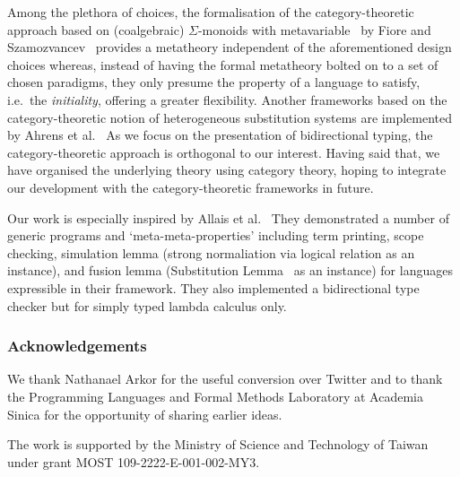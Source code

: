\documentclass[envcountsect,runningheads,a4paper]{llncs}
\begin{document}
Among the plethora of choices, the formalisation of the category-theoretic approach based on (coalgebraic) $\Sigma$-monoids with metavariable~\cite{Fiore2008} by Fiore and Szamozvancev~\cite{Fiore2022} provides a metatheory independent of the aforementioned design choices whereas, instead of having the formal metatheory bolted on to a set of chosen paradigms, they only presume the property of a language to satisfy, i.e.\ the \emph{initiality}, offering a greater flexibility.
Another frameworks based on the category-theoretic notion of heterogeneous substitution systems are implemented by Ahrens et al.~\cite{Ahrens2018,Ahrens2022}
As we focus on the presentation of bidirectional typing, the category-theoretic approach is orthogonal to our interest.
Having said that, we have organised the underlying theory using category theory, hoping to integrate our development with the category-theoretic frameworks in future.

Our work is especially inspired by Allais et al.~\cite{Allais2021}
They demonstrated a number of generic programs and `meta-meta-properties' including term printing, scope checking, simulation lemma (strong normaliation via logical relation as an instance), and fusion lemma (Substitution Lemma~\cite{Mitchell1991a} as an instance) for languages expressible in their framework.
They also implemented a bidirectional type checker but for simply typed lambda calculus only.



\subsubsection*{Acknowledgements}
We thank Nathanael Arkor for the useful conversion over Twitter and to thank the Programming Languages and Formal Methods Laboratory at Academia Sinica for the opportunity of sharing earlier ideas.

The work is supported by the Ministry of Science and Technology of Taiwan under grant MOST 109-2222-E-001-002-MY3.
 


%
\end{document}
